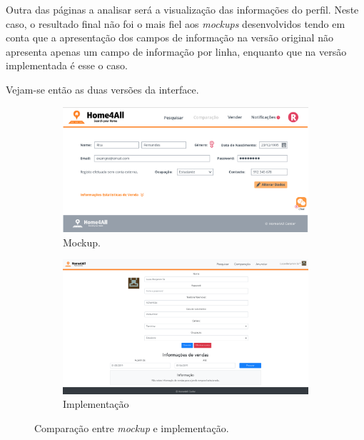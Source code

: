 Outra das páginas a analisar será a visualização das informações do perfil. Neste caso, o resultado final não foi o mais fiel aos \textit{mockups} desenvolvidos tendo em conta que a apresentação dos campos de informação na versão original não apresenta apenas um campo de informação por linha, enquanto que na versão implementada é esse o caso.

Vejam-se então as duas versões da interface.

\begin{figure}[htb]
\centering
    \begin{subfigure}[h]{0.5\textwidth}
        \includegraphics[width=\textwidth]{images/UI/PersonalInfo.png}
        \caption{Mockup.}
        \label{fig:fig1}
    \end{subfigure}
    \begin{subfigure}[h]{0.49\textwidth}
        \includegraphics[width=\textwidth]{images/UI/userInfo-real.png}
        \caption{Implementação}
        \label{fig:fig2}
    \end{subfigure}
\caption{Comparação entre \textit{mockup} e implementação.}
\label{fig:subfigureexample}
\end{figure}

